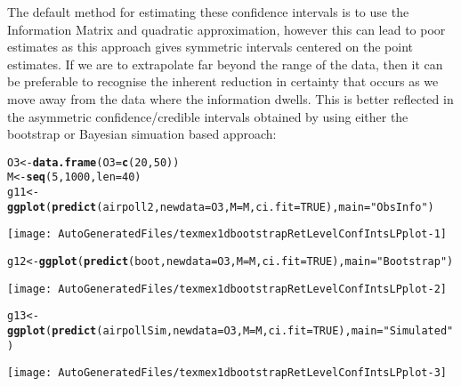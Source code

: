 \documentclass[10pt]{article}\usepackage[]{graphicx}\usepackage[]{color}
\makeatletter
\def\maxwidth{ %
  \ifdim\Gin@nat@width>\linewidth
    \linewidth
  \else
    \Gin@nat@width
  \fi
}
\newcommand{\hlnum}[1]{\textcolor[rgb]{0.686,0.059,0.569}{#1}}%
\newcommand{\hlstr}[1]{\textcolor[rgb]{0.192,0.494,0.8}{#1}}%
\newcommand{\hlstd}[1]{\textcolor[rgb]{0.345,0.345,0.345}{#1}}%
\newcommand{\hlkwb}[1]{\textcolor[rgb]{0.69,0.353,0.396}{#1}}%
\newcommand{\hlkwc}[1]{\textcolor[rgb]{0.333,0.667,0.333}{#1}}%
\newcommand{\hlkwd}[1]{\textcolor[rgb]{0.737,0.353,0.396}{\textbf{#1}}}%
\newenvironment{kframe}{%
 \def\at@end@of@kframe{}%
 \ifinner\ifhmode%
  \def\at@end@of@kframe{\end{minipage}}%
  \begin{minipage}{\columnwidth}%
 \fi\fi%
 \def\FrameCommand##1{\hskip\@totalleftmargin \hskip-\fboxsep
 \colorbox{shadecolor}{##1}\hskip-\fboxsep
     \hskip-\linewidth \hskip-\@totalleftmargin \hskip\columnwidth}%
 \MakeFramed {\advance\hsize-\width
   \@totalleftmargin\z@ \linewidth\hsize
   \@setminipage}}%
 {\par\unskip\endMakeFramed%
 \at@end@of@kframe}
\newenvironment{knitrout}{}{} %
\makeatother
\begin{document}
The default method for estimating these confidence intervals is to use the Information Matrix and quadratic approximation, however this can lead to poor estimates as this approach gives symmetric intervals centered on the point estimates.
If we are to extrapolate far beyond the range of the data, then it can be preferable to recognise the inherent reduction in certainty that occurs as we move away from the data where the information dwells.  This is better reflected in the asymmetric confidence/credible intervals obtained by using either the bootstrap or Bayesian simuation based approach:
\begin{knitrout}
\color{fgcolor}\begin{kframe}
\begin{alltt}
\hlstd{O3} \hlkwb{<-} \hlkwd{data.frame}\hlstd{(}\hlkwc{O3}\hlstd{=}\hlkwd{c}\hlstd{(}\hlnum{20}\hlstd{,}\hlnum{50}\hlstd{))}
\hlstd{M} \hlkwb{<-} \hlkwd{seq}\hlstd{(}\hlnum{5}\hlstd{,}\hlnum{1000}\hlstd{,}\hlkwc{len}\hlstd{=}\hlnum{40}\hlstd{)}
\hlstd{g11} \hlkwb{<-} \hlkwd{ggplot}\hlstd{(}\hlkwd{predict}\hlstd{(airpoll2,}\hlkwc{newdata}\hlstd{=O3,}\hlkwc{M}\hlstd{=M,}\hlkwc{ci.fit}\hlstd{=}\hlnum{TRUE}\hlstd{),}\hlkwc{main}\hlstd{=}\hlstr{"Obs Info"}\hlstd{)}
\end{alltt}
\end{kframe}
\texttt{[image: AutoGeneratedFiles/texmex1dbootstrapRetLevelConfIntsLPplot-1]} 
\begin{kframe}\begin{alltt}
\hlstd{g12} \hlkwb{<-} \hlkwd{ggplot}\hlstd{(}\hlkwd{predict}\hlstd{(boot,}\hlkwc{newdata}\hlstd{=O3,}\hlkwc{M}\hlstd{=M,}\hlkwc{ci.fit}\hlstd{=}\hlnum{TRUE}\hlstd{),}\hlkwc{main}\hlstd{=}\hlstr{"Bootstrap"}\hlstd{)}
\end{alltt}
\end{kframe}
\texttt{[image: AutoGeneratedFiles/texmex1dbootstrapRetLevelConfIntsLPplot-2]} 
\begin{kframe}\begin{alltt}
\hlstd{g13} \hlkwb{<-} \hlkwd{ggplot}\hlstd{(}\hlkwd{predict}\hlstd{(airpollSim,}\hlkwc{newdata}\hlstd{=O3,}\hlkwc{M}\hlstd{=M,}\hlkwc{ci.fit}\hlstd{=}\hlnum{TRUE}\hlstd{),}\hlkwc{main}\hlstd{=}\hlstr{"Simulated"}\hlstd{)}
\end{alltt}
\end{kframe}
\texttt{[image: AutoGeneratedFiles/texmex1dbootstrapRetLevelConfIntsLPplot-3]} 
\begin{kframe}\begin{alltt}

\end{alltt}
\end{kframe}
\end{knitrout}
\end{document}
